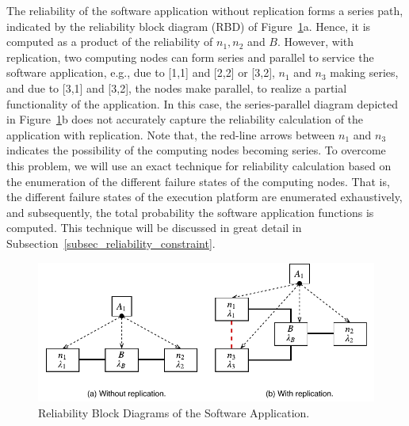 The reliability of the software application without replication forms a series path, indicated by the reliability block diagram (RBD) of Figure~\ref{fig_rbd}a. Hence, it is computed as a product of the reliability of $n_1,n_2$ and $B$. However, with replication, two computing nodes can form series and parallel to service the software application,  e.g., due to [1,1] and [2,2] or [3,2], $n_1$ and $n_3$ making series, and due to [3,1] and [3,2], the nodes make parallel, to realize a partial functionality of the application. In this case, the series-parallel diagram depicted in Figure~\ref{fig_rbd}b does not accurately capture the reliability calculation of the application with replication. Note that, the red-line arrows between $n_1$ and $n_3$ indicates the possibility of the computing nodes becoming series. To overcome this problem, we will use an exact technique for reliability calculation based on the enumeration of the different failure states of the computing nodes. That is, the different failure states of the execution platform are enumerated exhaustively, and subsequently, the total probability the software application functions is computed. This technique will be discussed in great detail in Subsection~\ref{subsec_reliability_constraint}.
\begin{figure}
	\centering
	\includegraphics[width=0.8\linewidth]{img/rbd_replication}
	\caption{Reliability Block Diagrams of the Software Application.}
	\label{fig_rbd}
\end{figure}



